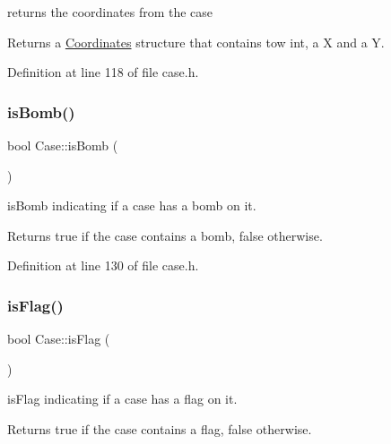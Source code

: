 returns the coordinates from the case 

\begin{DoxyReturn}{Returns}
a \hyperlink{struct_coordinates}{Coordinates} structure that contains tow int, a X and a Y. 
\end{DoxyReturn}


Definition at line 118 of file case.\+h.

\mbox{\label{class_case_a40789e3a7a8405f4dc8091d87ac25fd8}} 
\subsubsection{\texorpdfstring{is\+Bomb()}{isBomb()}}
{\footnotesize\ttfamily bool Case\+::is\+Bomb (\begin{DoxyParamCaption}{ }\end{DoxyParamCaption})\hspace{0.3cm}{\ttfamily [inline]}}



is\+Bomb indicating if a case has a bomb on it. 

\begin{DoxyReturn}{Returns}
true if the case contains a bomb, false otherwise. 
\end{DoxyReturn}


Definition at line 130 of file case.\+h.

\mbox{\label{class_case_a9fdeaaa245f3af19ea057b93aa2b423d}} 
\subsubsection{\texorpdfstring{is\+Flag()}{isFlag()}}
{\footnotesize\ttfamily bool Case\+::is\+Flag (\begin{DoxyParamCaption}{ }\end{DoxyParamCaption})\hspace{0.3cm}{\ttfamily [inline]}}



is\+Flag indicating if a case has a flag on it. 

\begin{DoxyReturn}{Returns}
true if the case contains a flag, false otherwise. 
\end{DoxyReturn}


